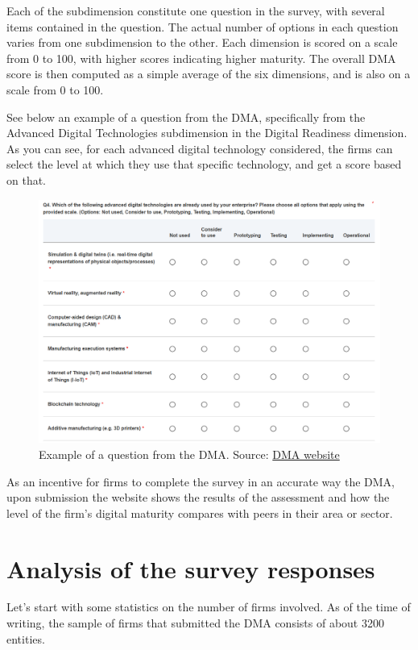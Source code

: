 \documentclass[12pt]{report}
\begin{document}
\par Each of the subdimension constitute one question in the survey, with several items contained in the question. The actual number of options in each question varies from one subdimension to the other. Each dimension is scored on a scale from 0 to 100, with higher scores indicating higher maturity. The overall DMA score is then computed as a simple average of the six dimensions, and is also on a scale from  0 to 100.

\par See below an example of a question from the DMA, specifically from the Advanced Digital Technologies subdimension in the Digital Readiness dimension. As you can see, for each advanced digital technology considered, the firms can select the level at which they use that specific technology, and get a score based on that.

\begin{figure}[ht]
    \centering
    \includegraphics[width=1\textwidth]{Figures/04-dmasurveyquestionexample.png}
    \caption{Example of a question from the DMA. Source: \href{https://european-digital-innovation-hubs.ec.europa.eu/open-dma}{DMA website}}
    \label{fig:dma_survey_question}
\end{figure}

\par As an incentive for firms to complete the survey in an accurate way the DMA, upon submission the website shows the results of the assessment and how the level of the firm's digital maturity compares with peers in their area or sector.




\newpage
\section{Analysis of the survey responses}
\par Let's start with some statistics on the number of firms involved. As of the time of writing, the sample of firms that submitted the DMA consists of about 3200 entities.
\end{document}
